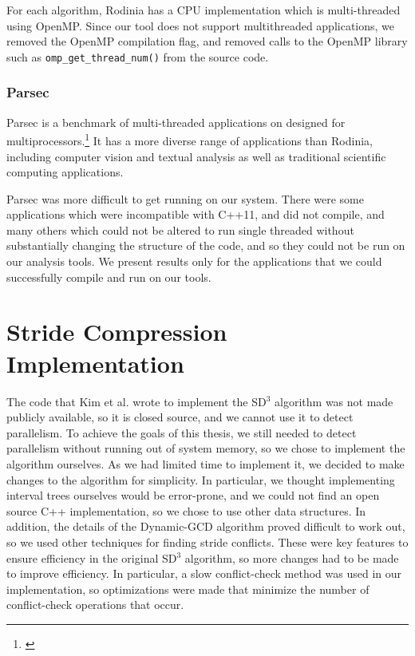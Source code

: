\documentclass[12pt,twoside]{reedthesis}
\begin{document}
		
		For each algorithm, Rodinia has a CPU implementation which is multi-threaded using OpenMP. Since our tool does not support multithreaded applications, we removed the OpenMP compilation flag, and removed calls to the OpenMP library such as \texttt{omp\_get\_thread\_num()} from the source code. 
		
		\subsubsection{Parsec}
		
		Parsec is a benchmark of multi-threaded applications on designed for multiprocessors.\footnote{\cite{Bienia:2008}} It has a more diverse range of applications than Rodinia, including computer vision and textual analysis as well as traditional scientific computing applications.
		
		Parsec was more difficult to get running on our system. There were some applications which were incompatible with C++11, and did not compile, and many others which could not be altered to run single threaded without substantially changing the structure of the code, and so they could not be run on our analysis tools. We present results only for the applications that we could successfully compile and run on our tools. 
		

	
	\section{Stride Compression Implementation}
	
		The code that Kim et al. wrote to implement the SD$^3$ algorithm was not made publicly available, so it is closed source, and we cannot use it to detect parallelism. To achieve the goals of this thesis, we still needed to detect parallelism without running out of system memory, so we chose to implement the algorithm ourselves. As we had limited time to implement it, we decided to make changes to the algorithm for simplicity. In particular, we thought implementing interval trees ourselves would be error-prone, and we could not find an open source C++ implementation, so we chose to use other data structures. 
		In addition, the details of the Dynamic-GCD algorithm proved difficult to work out, so we used other techniques for finding stride conflicts.
		These were key features to ensure efficiency in the original SD$^3$ algorithm, so more changes had to be made to improve efficiency. In particular, a slow conflict-check method was used in our implementation, so optimizations were made that minimize the number of conflict-check operations that occur. 
		
\end{document}
